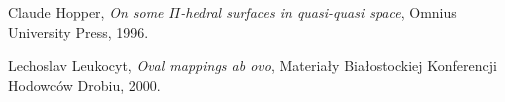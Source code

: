 \documentclass[licencjacka]{pracamgr}
\theoremstyle{definition}
\theoremstyle{remark}
\begin{document}
\begin{thebibliography}{99}


 Claude Hopper, \textit{On some $\Pi$-hedral
    surfaces in quasi-quasi space}, Omnius University Press, 1996.

 Lechoslav Leukocyt, \textit{Oval mappings ab ovo},
  Materiały Białostockiej Konferencji Hodowców Drobiu, 2000.


\end{thebibliography}
\end{document}
